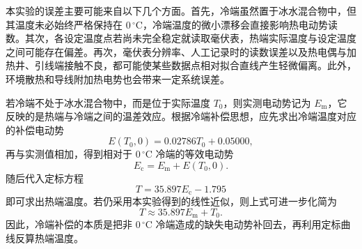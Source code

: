 \documentclass{../template/myrpt}
\begin{document}
本实验的误差主要可能来自以下几个方面。首先，冷端虽然置于冰水混合物中，但其温度未必始终严格保持在 $0\,^{\circ}\mathrm{C}$，冷端温度的微小漂移会直接影响热电动势读数。其次，各设定温度点若尚未完全稳定就读取毫伏表，热端实际温度与设定温度之间可能存在偏差。再次，毫伏表分辨率、人工记录时的读数误差以及热电偶与加热井、引线端接触不良，都可能使某些数据点相对拟合直线产生轻微偏离。此外，环境散热和导线附加热电势也会带来一定系统误差。

若冷端不处于冰水混合物中，而是位于实际温度 $T_0$，则实测电动势记为 $E_{\mathrm{m}}$，它反映的是热端与冷端之间的温差效应。根据冷端补偿思想，应先求出冷端温度对应的补偿电动势
\[
  E(T_0,0) = 0.02786T_0 + 0.05000,
\]
再与实测值相加，得到相对于 $0\,^{\circ}\mathrm{C}$ 冷端的等效电动势
\[
  E_{\mathrm{c}} = E_{\mathrm{m}} + E(T_0,0).
\]
随后代入定标方程
\[
  T = 35.897E_{\mathrm{c}} - 1.795
\]
即可求出热端温度。若仍采用本实验得到的线性近似，则上式可进一步化简为
\[
  T \approx 35.897E_{\mathrm{m}} + T_0.
\]
因此，冷端补偿的本质是把非 $0\,^{\circ}\mathrm{C}$ 冷端造成的缺失电动势补回去，再利用定标曲线反算热端温度。

\insertSignedDataPage
\end{document}
